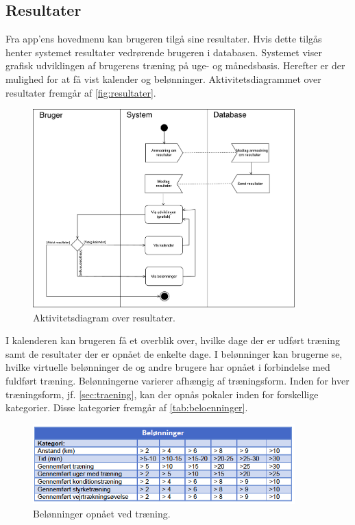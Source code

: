 \subsection{Resultater}
Fra app'ens hovedmenu kan brugeren tilgå sine resultater. Hvis dette tilgås henter systemet resultater vedrørende brugeren i databasen. Systemet viser grafisk udviklingen af brugerens træning på uge- og månedsbasis. Herefter er der mulighed for at få vist kalender og belønninger. Aktivitetsdiagrammet over resultater fremgår af \autoref{fig:resultater}.

\begin{figure} [H]
\centering
\includegraphics[width=0.9\textwidth]{figures/aktivitetsdiagram/Resultater}
\caption{Aktivitetsdiagram over resultater.}
\label{fig:resultater}
\end{figure}

\noindent
I kalenderen kan brugeren få et overblik over, hvilke dage der er udført træning samt de resultater der er opnået de enkelte dage. I belønninger kan brugerne se, hvilke virtuelle belønninger de og andre brugere har opnået i forbindelse med fuldført træning. Belønningerne varierer afhængig af træningsform. Inden for hver træningsform, jf. \autoref{sec:traening}, kan der opnås pokaler inden for forskellige kategorier. Disse kategorier fremgår af \autoref{tab:beloenninger}.

\begin{figure} [H]
\centering
\includegraphics[width=0.9\textwidth]{figures/aktivitetsdiagram/beloeninnger}
\caption{Belønninger opnået ved træning.}
\label{tab:beloenninger}
\end{figure}

